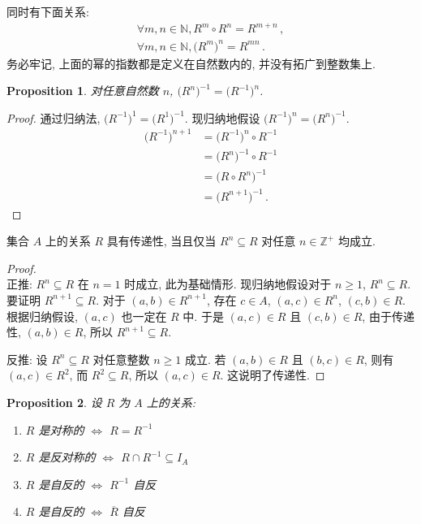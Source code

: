 \documentclass[UTF8]{ctexart}
\theoremstyle{mystyle}
\newtheorem{proposition}{Proposition}[section]
\theoremstyle{myremark}
\theoremstyle{plain}
\newcommand{\Z}{\mathbb Z}
\newcommand{\N}{\mathbb N}
\begin{document}
同时有下面关系:
\[ \begin{array}{c}
    \forall m,n \in \N, R^m \circ R^n = R^{m + n} \,, \\
    \forall m,n \in \N, \bigl( R^m \bigr)^n = R^{mn} \,.
\end{array} \]
务必牢记, 上面的幂的指数都是定义在自然数内的, 并没有拓广到整数集上.

\begin{proposition}
    对任意自然数 $ n $, $ \bigl( R^n \bigr)^{-1} = \bigl( R^{-1} \bigr)^n $. 
\end{proposition}

\begin{proof}
    通过归纳法, $ \bigl( R^{-1} \bigr)^1 = \bigl( R^1 \bigr)^{-1} $. 现归纳地假设 $ \bigl( R^{-1} \bigr)^n = \bigl( R^n \bigr)^{-1} $.
    \begin{align*}
        \bigl( R^{-1} \bigr)^{n + 1} &= \bigl( R^{-1} \bigr)^n \circ R^{-1} \\
        &= \bigl( R^n \bigr)^{-1} \circ R^{-1} \\
        &= \bigl( R \circ R^n \bigr)^{-1} \\
        &= \bigl( R^{n + 1} \bigr)^{-1} \,.
    \end{align*}
\end{proof}


\begin{theorem}
    集合 $ A $ 上的关系 $ R $ 具有传递性, 当且仅当 $ R^n \subseteq R $ 对任意 $ n \in \Z^+ $ 均成立.
\end{theorem}

\begin{proof} \ \\
    正推: $ R^n \subseteq R $ 在 $ n = 1 $ 时成立, 此为基础情形. 现归纳地假设对于 $ n \geqslant 1 $, $ R^n \subseteq R $. 要证明 $ R^{n + 1} \subseteq R $. 对于 $ (a, b) \in R^{n + 1} $, 存在 $ c \in A $, $ (a, c) \in R^n $, $ (c, b) \in R $. 根据归纳假设, $ (a, c) $ 也一定在 $ R $ 中. 于是 $ (a, c) \in R $ 且 $ (c, b) \in R $, 由于传递性, $ (a, b) \in R $, 所以 $ R^{n + 1} \subseteq R $.
    
    反推: 设 $ R^n \subseteq R $ 对任意整数 $ n \geqslant 1 $ 成立. 若 $ (a, b) \in R $ 且 $ (b, c) \in R $, 则有 $ (a, c) \in R^2 $, 而 $ R^2 \subseteq R $, 所以 $ (a, c) \in R $. 这说明了传递性.
\end{proof}


\begin{proposition}
    设 $ R $ 为 $ A $ 上的关系:
    \begin{enumerate}
        \item $ R $ 是对称的 $ \iff $ $ R = R^{-1} $
        \item $ R $ 是反对称的 $ \iff $ $ R \cap R^{-1} \subseteq I_A $
        \item $ R $ 是自反的 $ \iff $ $ R^{-1} $ 自反
        \item $ R $ 是自反的 $ \iff $ $ \overline R $ 自反
    \end{enumerate}
\end{proposition}
\end{document}
